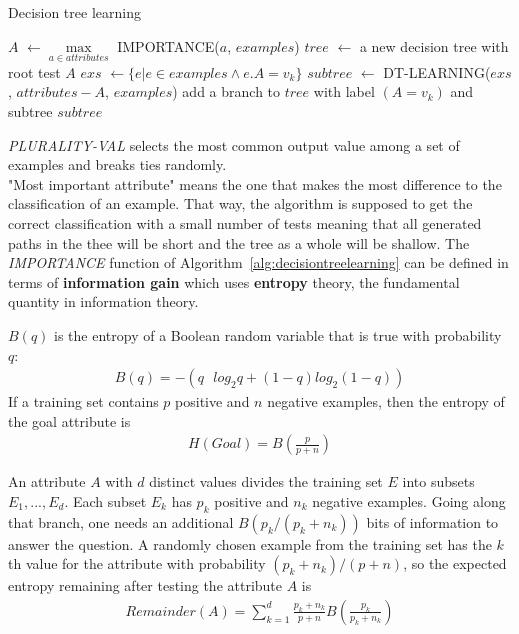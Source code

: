 \documentclass{report}
\begin{document}
\begin{algorithm}
\caption{Decision tree learning}
\label{alg:decisiontreelearning}
\begin{algorithmic}
 
 
 
\Else
\State $A$ $\gets \max\limits_{a\in attributes}$ IMPORTANCE($a$, $examples$)
\State $tree$ $\gets$ a new decision tree with root test $A$
\State $exs$ $\gets \{e \vert e\in examples \wedge e.A = v_k \}$
\State $subtree$ $\gets$ DT-LEARNING($exs$, $attributes - A$, $examples$)
\State add a branch to $tree$ with label $(A=v_k)$ and subtree $subtree$
\EndFor
\State {}
\EndIf
\EndFunction
\end{algorithmic}
\end{algorithm}

{\em PLURALITY-VAL} selects the most common output value among a set of examples and breaks ties randomly.
\\

"Most important attribute" means the one that makes the most difference to the classification of an example. That way, the algorithm is supposed to get the correct classification with a small number of tests meaning that all generated paths in the thee will be short and the tree as a whole will be shallow. The {\em IMPORTANCE} function of Algorithm~\ref{alg:decisiontreelearning} can be defined in terms of {\bf information gain} which uses {\bf entropy} theory, the fundamental quantity in information theory.


$B(q)$ is the entropy of a Boolean random variable that is true with probability $q$:
\begin{align*}
B(q) = -(q\mbox{ }log_2 q + (1-q)log_2(1-q))
\end{align*}
If a training set contains $p$ positive and $n$ negative examples, then the entropy of the goal attribute is
\begin{align*}
H(Goal) = B(\frac{p}{p+n})
\end{align*}

An attribute $A$ with $d$ distinct values divides the training set $E$ into subsets $E_1,...,E_d$. Each subset $E_k$ has $p_k$ positive and $n_k$ negative examples. Going along that branch, one needs an additional $B(p_k/(p_k+n_k))$ bits of information to answer the question. A randomly chosen example from the training set has the $k$th value for the attribute with probability $(p_k+n_k)/(p+n)$, so the expected entropy remaining after testing the attribute $A$ is
\begin{align*}
Remainder(A) = \sum_{k=1}^{d}\frac{p_k+n_k}{p+n}B(\frac{p_k}{p_k+n_k})
\end{align*}
\end{document}

